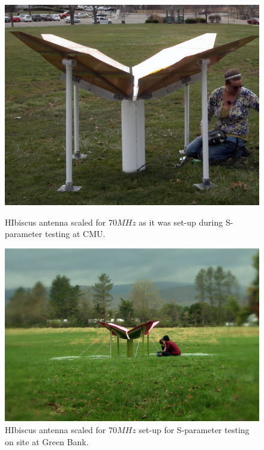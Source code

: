 \begin{figure}[htb]
\centering
\begin{minipage}[b]{0.43\textwidth}
\centering
\includegraphics[width=0.95\linewidth]{SCIHI_system/figures/HIbiscus_pgh_imp.jpg}
\caption{HIbiscus antenna scaled for $70 MHz$ as it was set-up during S-parameter testing at CMU. }
\label{Fig:hibiscus_first}
\end{minipage}%
\begin{minipage}[b]{0.02\textwidth}
\hspace{1cm}
\end{minipage}%
\begin{minipage}[b]{0.51\textwidth}
\centering
\includegraphics[width=0.95\linewidth]{SCIHI_system/figures/HIbiscus_gbt.jpg}
\caption{HIbiscus antenna scaled for $70 MHz$ set-up for S-parameter testing on site at Green Bank.}
\label{Fig:hibiscus_gbt}
\end{minipage}
\end{figure}


